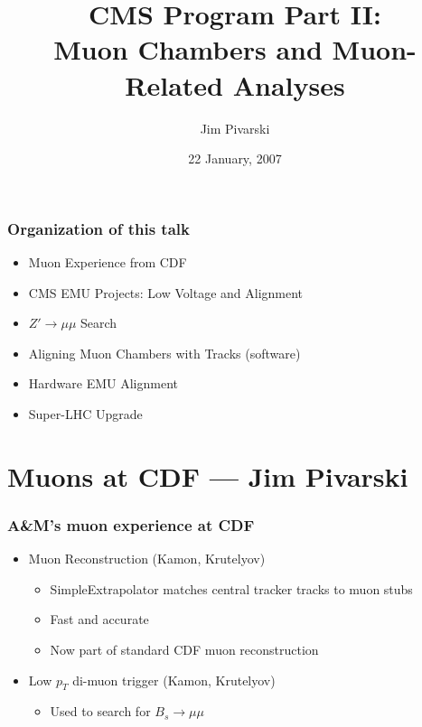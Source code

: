 \documentclass[compress]{beamer}
\title{CMS Program Part II: \\ Muon Chambers and Muon-Related Analyses}
\author{Jim Pivarski}
\institute{Texas A\&M University}
\date{22 January, 2007}
\begin{document}
\frame{\titlepage}

\begin{frame}
\frametitle{Organization of this talk}
\begin{itemize}\setlength{\itemsep}{0.5 cm}
  \item Muon Experience from CDF
  \item CMS EMU Projects: Low Voltage and Alignment
  \item $Z'\to\mu\mu$ Search
  \item Aligning Muon Chambers with Tracks (software)
  \item Hardware EMU Alignment
  \item Super-LHC Upgrade
\end{itemize}
\end{frame}

\section*{Muons at CDF --- Jim Pivarski}

\begin{frame}
\frametitle{A\&M's muon experience at CDF}

\begin{minipage}{0.8\linewidth}
  \begin{itemize}\setlength{\itemsep}{1 cm}
    \item Muon Reconstruction (Kamon, Krutelyov)

    \vspace{0.25 cm}
    \begin{itemize}\setlength{\itemsep}{0.25 cm}
      \item SimpleExtrapolator matches central tracker tracks to muon stubs
      \item Fast and accurate
      \item Now part of standard CDF muon reconstruction
    \end{itemize}

    \item Low $p_T$ di-muon trigger (Kamon, Krutelyov)

    \vspace{0.25 cm}
    \begin{itemize}
      \item Used to search for $B_s\to\mu\mu$
    \end{itemize}

  \end{itemize}
\end{minipage}
\end{frame}
\end{document}

